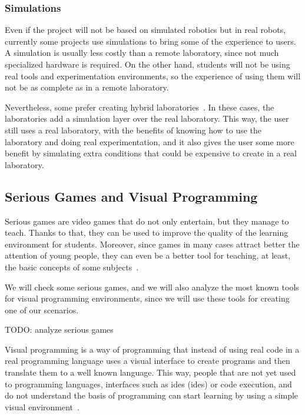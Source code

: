 \subsubsection{Simulations}

Even if the project will not be based on simulated robotics but in real robots, currently some
projects use simulations to bring some of the experience to users. A simulation is usually less
costly than a remote laboratory, since not much specialized hardware is required. On the other hand,
students will not be using real tools and experimentation environments, so the experience of using
them will not be as complete as in a remote laboratory.

Nevertheless, some prefer creating hybrid laboratories~\cite{hybrid_labs}. In these cases, the
laboratories add a simulation layer over the real laboratory. This way, the user still uses a real
laboratory, with the benefits of knowing how to use the laboratory and doing real experimentation,
and it also gives the user some more benefit by simulating extra conditions that could be expensive
to create in a real laboratory.

\subsection{Serious Games and Visual Programming}

Serious games are video games that do not only entertain, but they manage to teach. Thanks to that,
they can be used to improve the quality of the learning environment for students. Moreover, since
games in many cases attract better the attention of young people, they can even be a better tool for
teaching, at least, the basic concepts of some subjects~\cite{serious_games}.

We will check some serious games, and we will also analyze the most known tools for visual
programming environments, since we will use these tools for creating one of our scenarios.

TODO: analyze serious games

Visual programming is a way of programming that instead of using real code in a real programming
language uses a visual interface to create programs and then translate them to a well known
language. This way, people that are not yet used to programming languages, interfaces such as
\acrshort{ide}s (\acrlong{ide}s) or code execution, and do not understand the basis of programming
can start learning by using a simple visual environment~\cite{visual_programming}.


